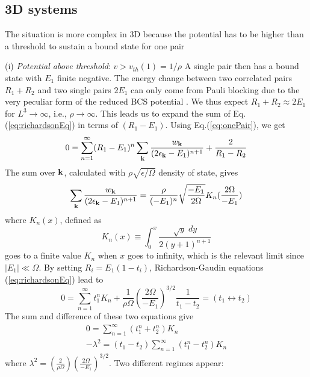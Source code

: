 \documentclass[5p,twocolumn]{elsarticle}
\begin{document}
\subsection{3D systems}

The situation is more complex in 3D because the potential has to be higher than a threshold to sustain a bound state for one pair

(i) {\it Potential above threshold}: $v>v_{th}(1)=1/\rho$ A single pair then has a bound state with $E_1$  finite negative. The energy change between two correlated pairs $R_{1}+R_{2}$ and two single pairs  $2E_{1}$ can only come from Pauli blocking due to the very peculiar form of the reduced BCS potential \cite{moth}. We thus expect $R_1+R_2\approx2E_1$ for $L^3\rightarrow\infty$, i.e., $\rho\rightarrow\infty$. This leads us to expand the sum of Eq.(\ref{eq:richardsonEq}) in terms of $(R_{1}-E_{1})$.  Using Eq.(\ref{eq:onePair}), we get
\begin{equation}
0=\sum_{n=1}^{\infty}(R_{1}-E_{1})^{n}\sum_{\mathbf{k}}\frac{w_{\mathbf{k}}}{(2\epsilon_{\mathbf{k}}-E_1)^{n+1}}+\frac{2}{R_1-R_2}
\end{equation}
The sum over $\mathbf{k}$, calculated with  $\rho\sqrt{\epsilon/\Omega}$ density of state, gives
\begin{equation}
\sum_{\mathbf{k}}\frac{w_{\mathbf{k}}}{(2\epsilon_{\mathbf{k}}-E_1)^{n+1}}=\\\frac{\rho}{(-E_{1})^{n}}\sqrt{\frac{-E_{1}}{2\Omega}}K_{n}(\frac{2\Omega}{-E_{1}})
\end{equation}
where $K_{n}(x)$, defined as
\begin{equation}
K_{n}(x)\equiv\int_{0}^{x}\frac{\sqrt{y}\;dy}{2(y+1)^{n+1}}
\end{equation}
goes to a finite value $K_{n}$ when $x$ goes to infinity, which is the relevant limit since $|E_1|\ll\Omega$.
By setting
$R_{i}=E_{1}(1-t_{i})$, Richardson-Gaudin equations (\ref{eq:richardsonEq})  lead to
\begin{equation}
0=\sum_{n=1}^{\infty}t_{1}^{n}K_{n}+\frac{1}{\rho\Omega}\left(\frac{2\Omega}{-E_{1}}\right)^{3/2}\frac{1}{t_1-t_2}=(t_{1}\leftrightarrow{}t_{2})
\end{equation}
The sum and difference of these two equations give
\begin{gather}
0=\sum_{n=1}^{\infty}(t_{1}^{n}+t_{2}^{n})K_{n}\label{eq:t2}\\
-\lambda^{2}=(t_{1}-t_{2})\sum_{n=1}^{\infty}(t_{1}^{n}-t_{2}^{n})K_{n}\label{eq:t1}
\end{gather}
where $\lambda^2=(\frac{2}{\rho\Omega})(\frac{2\Omega}{-E_{1}})^{3/2}$.
Two different regimes appear: 
\end{document}
